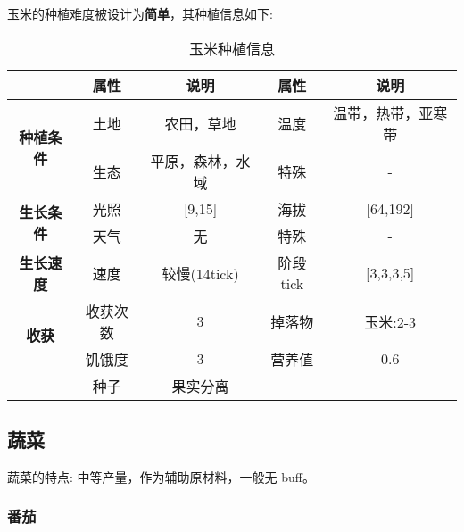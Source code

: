 玉米的种植难度被设计为\textbf{简单}，其种植信息如下:

\begin{table}[H]
    \centering
    \caption{玉米种植信息}
    \label{table:玉米种植信息}
    \setlength{\tabcolsep}{4mm}
    \begin{tabular}{c|cc|cc}
        \toprule
                                           & \textbf{属性} & \textbf{说明}    & \textbf{属性} & \textbf{说明}      \\
        \midrule
        \multirow{2}{*}{\textbf{种植条件}} & 土地          & 农田，草地       & 温度          & 温带，热带，亚寒带 \\
                                           & 生态          & 平原，森林，水域 & 特殊          & -                  \\
        \midrule
        \multirow{2}{*}{\textbf{生长条件}} & 光照          & [9,15]           & 海拔          & [64,192]           \\
                                           & 天气          & 无               & 特殊          & -                  \\
        \midrule
        \textbf{生长速度}                  & 速度          & 较慢(14tick)     & 阶段tick      & [3,3,3,5]          \\
        \midrule
        \multirow{2}{*}{\textbf{收获}}     & 收获次数      & 3                & 掉落物        & 玉米:2-3           \\
                                           & 饥饿度        & 3                & 营养值        & 0.6                \\
                                           & 种子 & 果实分离 \\
        \bottomrule
    \end{tabular}
\end{table}

\subsection{蔬菜}

蔬菜的特点: 中等产量，作为辅助原材料，一般无 buff。

\subsubsection{番茄}

